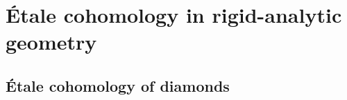             \minitoc
            
            
    
    \part{\'Etale cohomology in rigid-analytic geometry}
        \chapter{\'Etale cohomology of diamonds}
            \begin{abstract}
                
            \end{abstract}
            
            \minitoc
            
            
            
            
	
	\printbibliography

